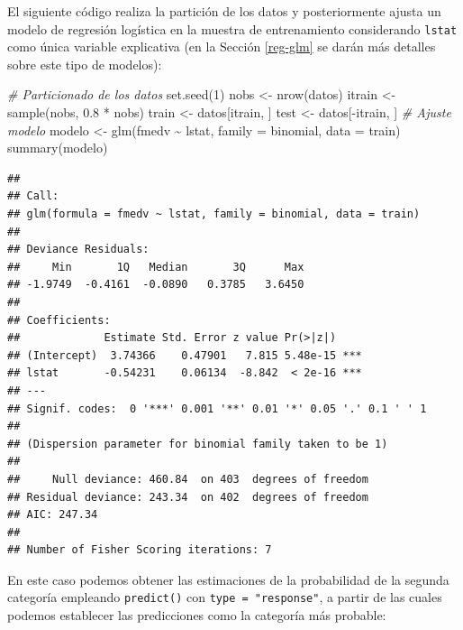 \documentclass[
  spanish,
]{book}
\newenvironment{Shaded}{\begin{snugshade}}{\end{snugshade}}
\newcommand{\AttributeTok}[1]{\textcolor[rgb]{0.77,0.63,0.00}{#1}}
\newcommand{\CommentTok}[1]{\textcolor[rgb]{0.56,0.35,0.01}{\textit{#1}}}
\newcommand{\DecValTok}[1]{\textcolor[rgb]{0.00,0.00,0.81}{#1}}
\newcommand{\FloatTok}[1]{\textcolor[rgb]{0.00,0.00,0.81}{#1}}
\newcommand{\FunctionTok}[1]{\textcolor[rgb]{0.00,0.00,0.00}{#1}}
\newcommand{\NormalTok}[1]{#1}
\newcommand{\OtherTok}[1]{\textcolor[rgb]{0.56,0.35,0.01}{#1}}
\newcommand{\SpecialCharTok}[1]{\textcolor[rgb]{0.00,0.00,0.00}{#1}}
\theoremstyle{break}
\theoremstyle{definition}
\theoremstyle{definition}
\theoremstyle{definition}
\theoremstyle{definition}
\theoremstyle{remark}
\begin{document}
El siguiente código realiza la partición de los datos y posteriormente ajusta un modelo de regresión logística en la muestra de entrenamiento considerando \texttt{lstat} como única variable explicativa (en la Sección \ref{reg-glm} se darán más detalles sobre este tipo de modelos):

\begin{Shaded}
\begin{Highlighting}[]
\CommentTok{\# Particionado de los datos}
\FunctionTok{set.seed}\NormalTok{(}\DecValTok{1}\NormalTok{)}
\NormalTok{nobs }\OtherTok{\textless{}{-}} \FunctionTok{nrow}\NormalTok{(datos)}
\NormalTok{itrain }\OtherTok{\textless{}{-}} \FunctionTok{sample}\NormalTok{(nobs, }\FloatTok{0.8} \SpecialCharTok{*}\NormalTok{ nobs)}
\NormalTok{train }\OtherTok{\textless{}{-}}\NormalTok{ datos[itrain, ]}
\NormalTok{test }\OtherTok{\textless{}{-}}\NormalTok{ datos[}\SpecialCharTok{{-}}\NormalTok{itrain, ]}
\CommentTok{\# Ajuste modelo}
\NormalTok{modelo }\OtherTok{\textless{}{-}} \FunctionTok{glm}\NormalTok{(fmedv }\SpecialCharTok{\textasciitilde{}}\NormalTok{ lstat, }\AttributeTok{family =}\NormalTok{ binomial, }\AttributeTok{data =}\NormalTok{ train)}
\FunctionTok{summary}\NormalTok{(modelo)}
\end{Highlighting}
\end{Shaded}

\begin{verbatim}
## 
## Call:
## glm(formula = fmedv ~ lstat, family = binomial, data = train)
## 
## Deviance Residuals: 
##     Min       1Q   Median       3Q      Max  
## -1.9749  -0.4161  -0.0890   0.3785   3.6450  
## 
## Coefficients:
##             Estimate Std. Error z value Pr(>|z|)    
## (Intercept)  3.74366    0.47901   7.815 5.48e-15 ***
## lstat       -0.54231    0.06134  -8.842  < 2e-16 ***
## ---
## Signif. codes:  0 '***' 0.001 '**' 0.01 '*' 0.05 '.' 0.1 ' ' 1
## 
## (Dispersion parameter for binomial family taken to be 1)
## 
##     Null deviance: 460.84  on 403  degrees of freedom
## Residual deviance: 243.34  on 402  degrees of freedom
## AIC: 247.34
## 
## Number of Fisher Scoring iterations: 7
\end{verbatim}

En este caso podemos obtener las estimaciones de la probabilidad de la segunda categoría empleando \texttt{predict()} con \texttt{type\ =\ "response"}, a partir de las cuales podemos establecer las predicciones como la categoría más probable:
\end{document}

